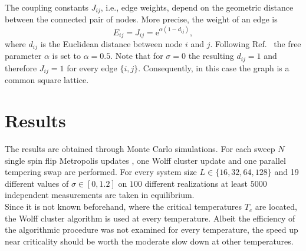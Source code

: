 \documentclass[pre,twocolumn,groupedaddress,showpacs,showkeys,amsmath,amssymb,floatfix]{revtex4-1}
\begin{document}
            The coupling constants \(J_{ij}\), i.e., edge weights, depend on the
            geometric distance between the connected pair of nodes. More precise,
            the weight of an edge is
            \begin{equation}
                E_{ij} = J_{ij} = \mathrm{e}^{\alpha (1-d_{ij})},
                \label{eq:coupling}
            \end{equation}
            where \(d_{ij}\) is the Euclidean
            distance between node \(i\) and \(j\). Following Ref.~\cite{Lima2000}
            the free parameter \(\alpha\) is set to \(\alpha = 0.5\).
            Note that for \(\sigma = 0\) the resulting \(d_{ij} = 1\) and therefore
            \(J_{ij} = 1\) for every edge $\{i,j\}$. Consequently, in this case
            the graph is a common square lattice.


    \section{Results}
        \label{sec:results}
        The results are obtained through Monte Carlo simulations. For each
        sweep \(N\) single spin flip Metropolis updates \cite{Metropolis1953},
        one Wolff cluster update \cite{Wolff1989} and one
        parallel tempering swap \cite{ParallelTempering1986} are performed.
        For every system size $L \in \{16,32,64,128\}$ and 19 different values of
        $\sigma \in [0,1.2]$ on $100$ different realizations at least $5000$
        independent measurements are taken in equilibrium.\\
        Since it is not known beforehand, where the critical temperatures \(T_c\)
        are located, the Wolff cluster algorithm is used at every
        temperature. Albeit the efficiency of the algorithmic procedure was
        not examined for every temperature, the speed up near criticality
        should be worth the moderate slow down at other temperatures.\\
\end{document}
